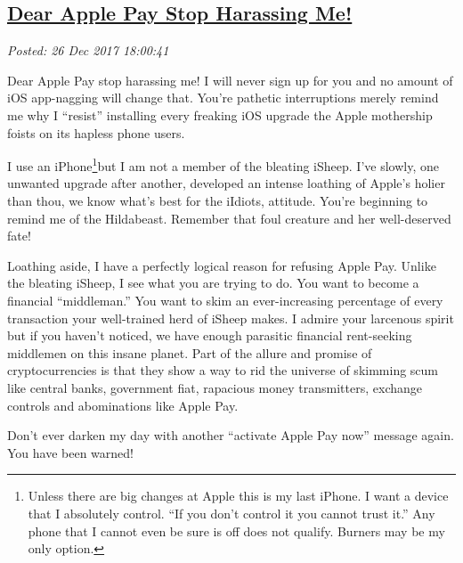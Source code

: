 %

\subsection*{\href{https://analyzethedatanotthedrivel.org/2017/12/26/dear-apple-pay-stop-harassing-me/}{Dear Apple Pay Stop Harassing Me!}}


\noindent\emph{Posted: 26 Dec 2017 18:00:41}
\vspace{6pt}

Dear Apple Pay stop harassing me! I will never sign up for you and no
amount of iOS app-nagging will change that. You're pathetic
interruptions merely remind me why I ``resist'' installing every
freaking iOS upgrade the Apple mothership foists on its hapless phone
users.

I use an iPhone\footnote{Unless there are big changes at Apple this is my last iPhone. I want a
  device that I absolutely control. ``If you don't control it you cannot
  trust it.'' Any phone that I cannot even be sure is off does not
  qualify. Burners may be my only option.
}but I am not
a member of the bleating iSheep. I've slowly, one unwanted upgrade after
another, developed an intense loathing of Apple's holier than thou, we
know what's best for the iIdiots, attitude. You're beginning to remind
me of the Hildabeast. Remember that foul creature and her well-deserved
fate!

Loathing aside, I have a perfectly logical reason for refusing Apple
Pay. Unlike the bleating iSheep, I see what you are trying to do. You
want to become a financial ``middleman.'' You want to skim an
ever-increasing percentage of every transaction your well-trained herd
of iSheep makes. I admire your larcenous spirit but if you haven't
noticed, we have enough parasitic financial rent-seeking middlemen on
this insane planet. Part of the allure and promise of cryptocurrencies
is that they show a way to rid the universe of skimming scum like
central banks, government fiat, rapacious money transmitters, exchange
controls and abominations like Apple Pay.

Don't ever darken my day with another ``activate Apple Pay now'' message
again. You have been warned!

%
%
%



%
 
